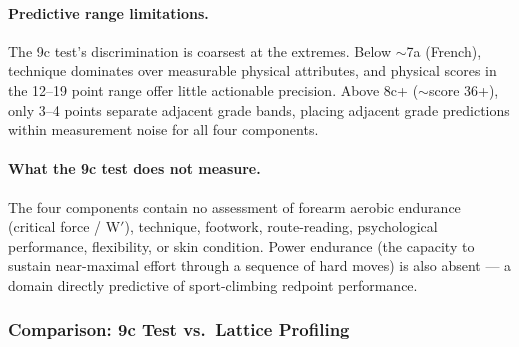 \paragraph{Predictive range limitations.}
The 9c test's discrimination is coarsest at the extremes. Below $\sim$7a (French), technique dominates over measurable physical attributes, and physical scores in the 12--19 point range offer little actionable precision. Above 8c+ ($\sim$score 36+), only 3--4 points separate adjacent grade bands, placing adjacent grade predictions within measurement noise for all four components.

\paragraph{What the 9c test does not measure.}
The four components contain no assessment of forearm aerobic endurance (critical force / W$'$), technique, footwork, route-reading, psychological performance, flexibility, or skin condition. Power endurance (the capacity to sustain near-maximal effort through a sequence of hard moves) is also absent --- a domain directly predictive of sport-climbing redpoint performance.

\subsubsection{Comparison: 9c Test vs.\ Lattice Profiling}

